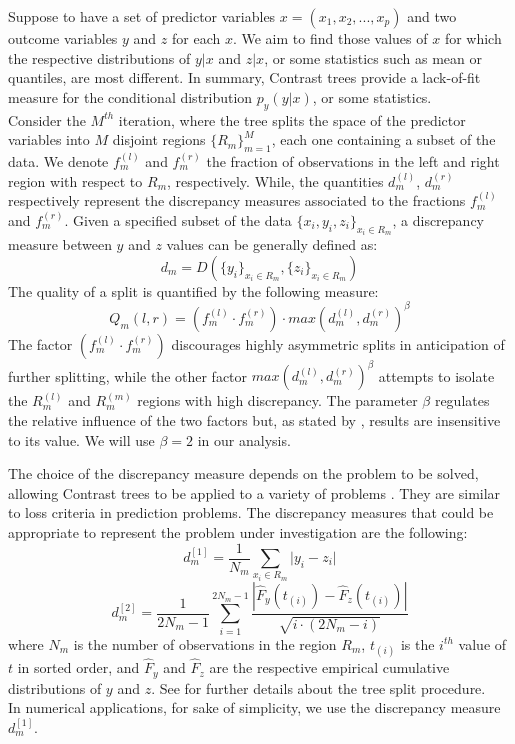 \documentclass[fleqn,10pt]{wlscirep}
\begin{document}
Suppose to have a set of predictor variables $x = (x_1, x_2,...,x_p)$ and two outcome variables $y$ and $z$ for each $x$. We aim to find those values of $x$ for which the respective distributions of $y | x$ and $z | x$, or some statistics such as mean or quantiles, are most different. In summary, Contrast trees provide a lack-of-fit measure for the conditional distribution $p_y(y | x)$, or some statistics.\\
Consider the $M^{th}$ iteration, where the tree splits the space of the predictor variables into $M$ disjoint regions $\lbrace R_m\rbrace^M_{m=1}$, each one containing a subset of the data. We denote $f_m^{(l)}$ and $f_m^{(r)}$ the fraction of observations in the left and right region with respect to $R_m$, respectively. While, the quantities $d_m^{(l)}$, $d_m^{(r)}$ respectively represent the discrepancy measures associated to the fractions $f_m^{(l)}$ and $f_m^{(r)}$. Given a specified subset of the data $\lbrace x_i,y_i,z_i \rbrace_{x_i\in R_m}$, a discrepancy measure between $y$ and $z$ values can be generally defined as:
\begin{equation}
\label{eq:dm}
d_m=D\left( \lbrace y_i\rbrace_{x_i\in R_m},\lbrace z_i\rbrace_{x_i\in R_m}\right)
\end{equation}
The quality of a split is quantified by the following measure:
\begin{equation}
Q_m(l,r)=\left(f_m^{(l)} \cdot f_m^{(r)}\right) \cdot max\left(d_m^{(l)}, d_m^{(r)} \right)^{\beta}
\end{equation}
The factor $\left(f_m^{(l)} \cdot f_m^{(r)}\right)$ discourages highly asymmetric splits in anticipation of further splitting, while the other factor $max\left(d_m^{(l)}, d_m^{(r)} \right)^{\beta}$ attempts to isolate the $R_m^{(l)}$ and $R_m^{(m)}$ regions with high discrepancy. The parameter $\beta$ regulates the relative influence of the two factors but, as stated by \cite{Friedman2020}, results are insensitive to its value. We will use $\beta=2$ in our analysis.

The choice of the discrepancy measure depends on the problem to be solved, allowing Contrast trees to be applied to a variety of problems \cite{Friedman2020}. They are similar to loss criteria in prediction problems. The discrepancy measures that could be appropriate to represent the problem under investigation are the following:
\begin{equation}
\label{eq:dm1}
d_m^{[1]} = \frac{1}{N_m} \sum_{x_i \in R_m} \lvert y_i-z_i \rvert
\end{equation}
%
\begin{equation}
\label{eq:dm2}
d_m^{[2]} = \frac{1}{2N_m-1} \sum_{i =1}^{2N_m-1} \frac{\left| \hat{F}_y(t_{(i)})-\hat{F}_z(t_{(i)})\right|}{\sqrt{i\cdot(2N_m-i)}}
\end{equation}
where $N_m$ is the number of observations in the region $R_m$,  $t_{(i)}$ is the $i^{th}$ value of $t$ in sorted order, and $\hat{F}_y$ and $\hat{F}_z$ are the respective empirical cumulative distributions of $y$ and $z$. See \cite{Friedman2020} for further details about the tree split procedure.\\
In numerical applications, for sake of simplicity, we use the discrepancy measure $d_m^{[1]}$.
\end{document}
